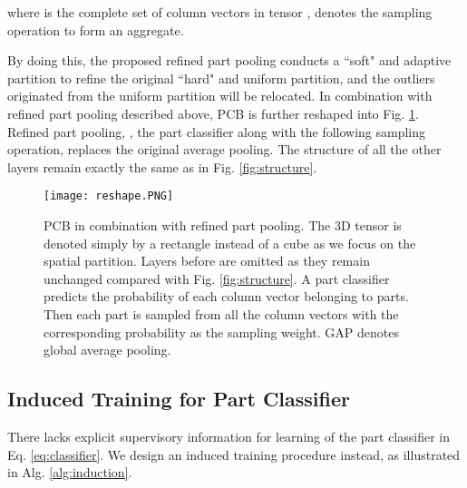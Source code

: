 \documentclass[10pt,twocolumn,letterpaper]{article}
\begin{document}
{{{where  is the complete set of column vectors in tensor \bm{},  denotes the sampling operation to form an aggregate. 

By doing this, the proposed refined part pooling conducts a ``soft" and adaptive partition to refine the original ``hard" and uniform partition, and the outliers originated from the uniform partition will be relocated. In combination with refined part pooling described above, PCB is further reshaped into Fig. \ref{fig:reshape}. Refined part pooling, \ie, the part classifier along with the following sampling operation, replaces the original average pooling. The structure of all the other layers remain exactly the same as in Fig. \ref{fig:structure}. 


\begin{figure}[t]
\setlength{\abovecaptionskip}{-0.1cm} 
\setlength{\belowcaptionskip}{-0.2cm}
\begin{center}
\texttt{[image: reshape.PNG]}
\end{center}
   \caption{PCB in combination with refined part pooling. The 3D tensor \bm{} is denoted simply by a rectangle instead of a cube as we focus on the spatial partition. Layers before \bm{} are omitted as they remain unchanged compared with Fig. \ref{fig:structure}. A part classifier predicts the probability of each column vector belonging to  parts. Then each part is sampled from all the column vectors with the corresponding probability as the sampling weight. GAP denotes global average pooling. }
\label{fig:reshape}
\end{figure}



\subsection{Induced Training for Part Classifier}\label{sec:train}

There lacks explicit supervisory information for learning  of the part classifier in Eq. \ref{eq:classifier}. 
We design an induced training procedure instead, as illustrated in Alg. \ref{alg:induction}.

}}}
\end{document}
